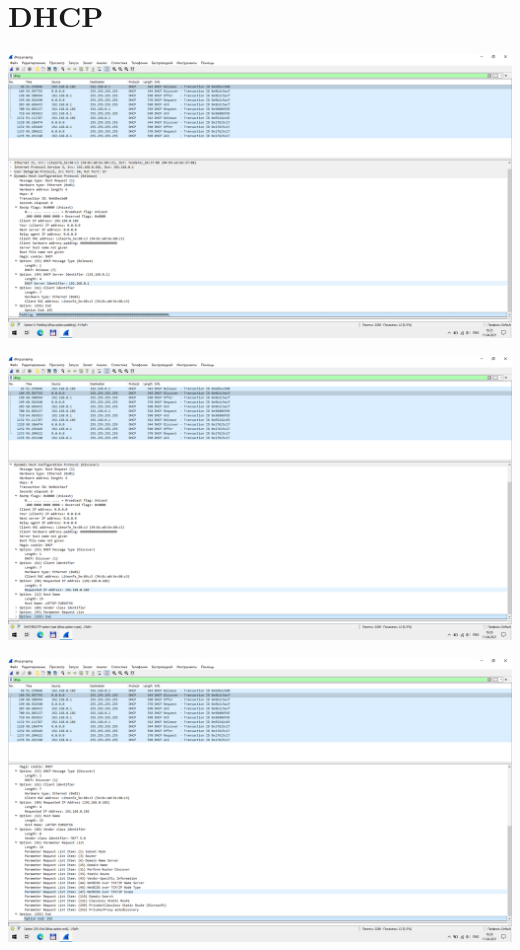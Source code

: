 
\section{DHCP}

\includegraphics[width=\textwidth]{screenshots/dhcp_release_1}

\includegraphics[width=\textwidth]{screenshots/dhcp_discover_1}

\includegraphics[width=\textwidth]{screenshots/dhcp_discover_2}

